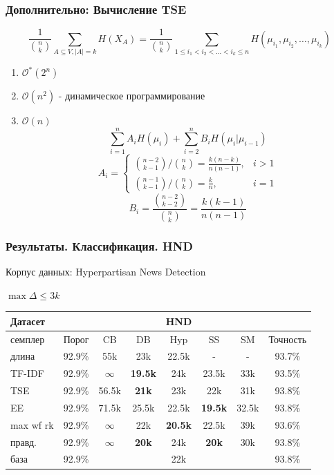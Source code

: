 \documentclass{beamer}
\begin{document}
\begin{frame}[label=supplemental,noframenumbering]
	\frametitle{Дополнительно: Вычисление TSE}
	\[
	\frac{1}{\binom{n}{k}}\sum\limits_{A\subseteq V,|A|=k}H(X_A) =
	\frac{1}{\binom{n}{k}}\sum\limits_{1 \le i_1 < i_2 < \ldots < i_k \le n}H(\mu_{i_1}, \mu_{i_2}, \ldots, \mu_{i_k})
	\]
	\begin{enumerate}
		\item $\mathcal{O^*}(2^n)$
		\item $\mathcal{O}(n^2)$ - динамическое программирование
		\item $\mathcal{O}(n)$
		\[
		\sum\limits_{i=1}^{n}A_iH(\mu_i) + \sum\limits_{i=2}^{n}B_iH(\mu_i|\mu_{i-1})
		\]
		\[
		A_i = 
		\begin{cases}
		\binom{n-2}{k-1}/\binom{n}{k}=\frac{k(n-k)}{n(n-1)},& i > 1 \\
		\binom{n-1}{k-1}/\binom{n}{k}=\frac k n,& i = 1
		\end{cases}
		\]
		\[
		B_i = \frac{\binom{n-2}{k-2}}{\binom{n}{k}} = \frac{k(k-1)}{n(n-1)}
		\]
	\end{enumerate}
\end{frame}

\begin{frame}[label=supplemental,noframenumbering]
	\frametitle{Результаты. Классификация. HND}
	
	Корпус данных: Hyperpartisan News Detection
	
	$\max\Delta \le 3k$
	\begin{table}
		\begin{tabular}{l|c|ccccc|c}
			Датасет & & \multicolumn{5}{c}{HND}&\\
			\hline
			семплер & Порог & CB & DB & Hyp & SS & SM & Точность\\
			\hline
			длина & 92.9\% & 55k & 23k & 22.5k & - & - & 93.7\% \\
			TF-IDF & 92.9\%  & $\infty$ & {\bf 19.5k} & 24k & 23.5k & 33k & 93.5\% \\
			TSE & 92.9\% & 56.5k & {\bf 21k} & 23k & 22k & 31k & 93.8\% \\
			EE & 92.9\%  & 71.5k & 25.5k & 22.5k & {\bf 19.5k} & 32.5k & 93.8\% \\
			max wf rk & 92.9\%  & $\infty$ & 22k & {\bf 20.5k} & 22.5k & 39k & 93.6\% \\
			правд. & 92.9\%  & $\infty$ & {\bf 20k} & 24k & {\bf 20k} & 30k & 93.8\% \\
			\hline
			база & 92.9\%  & \multicolumn{5}{c}{22k} & 93.8\%
		\end{tabular}
	\end{table}
\end{frame}
\end{document}
